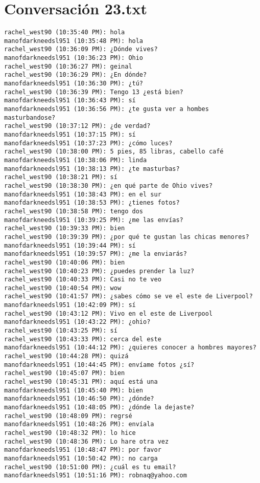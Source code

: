 \section{Conversaci\'on 23.txt}

\begin{verbatim}
rachel_west90 (10:35:40 PM): hola
manofdarkneedsl951 (10:35:48 PM): hola
rachel_west90 (10:36:09 PM): ¿Dónde vives?
manofdarkneedsl951 (10:36:23 PM): Ohio
rachel_west90 (10:36:27 PM): geinal
rachel_west90 (10:36:29 PM): ¿En dónde?
manofdarkneedsl951 (10:36:30 PM): ¿tú?
rachel_west90 (10:36:39 PM): Tengo 13 ¿está bien?
manofdarkneedsl951 (10:36:43 PM): sí
manofdarkneedsl951 (10:36:56 PM): ¿te gusta ver a hombes masturbandose?
rachel_west90 (10:37:12 PM): ¿de verdad?
manofdarkneedsl951 (10:37:15 PM): sí
manofdarkneedsl951 (10:37:23 PM): ¿cómo luces?
rachel_west90 (10:38:00 PM): 5 pies, 85 libras, cabello café
manofdarkneedsl951 (10:38:06 PM): linda
manofdarkneedsl951 (10:38:13 PM): ¿te masturbas?
rachel_west90 (10:38:21 PM): sí
rachel_west90 (10:38:30 PM): ¿en qué parte de Ohio vives?
manofdarkneedsl951 (10:38:43 PM): en el sur
manofdarkneedsl951 (10:38:53 PM): ¿tienes fotos?
rachel_west90 (10:38:58 PM): tengo dos
manofdarkneedsl951 (10:39:25 PM): ¿me las envías?
rachel_west90 (10:39:33 PM): bien
rachel_west90 (10:39:39 PM): ¿por qué te gustan las chicas menores?
manofdarkneedsl951 (10:39:44 PM): sí
manofdarkneedsl951 (10:39:57 PM): ¿me la enviarás?
rachel_west90 (10:40:06 PM): bien
rachel_west90 (10:40:23 PM): ¿puedes prender la luz?
rachel_west90 (10:40:33 PM): Casi no te veo
rachel_west90 (10:40:54 PM): wow
rachel_west90 (10:41:57 PM): ¿sabes cómo se ve el este de Liverpool?
manofdarkneedsl951 (10:42:09 PM): sí
rachel_west90 (10:43:12 PM): Vivo en el este de Liverpool
manofdarkneedsl951 (10:43:22 PM): ¿ohio?
rachel_west90 (10:43:25 PM): sí
rachel_west90 (10:43:33 PM): cerca del este
manofdarkneedsl951 (10:44:12 PM): ¿quieres conocer a hombres mayores?
rachel_west90 (10:44:28 PM): quizá
manofdarkneedsl951 (10:44:45 PM): envíame fotos ¿sí?
rachel_west90 (10:45:07 PM): bien
rachel_west90 (10:45:31 PM): aquí está una
manofdarkneedsl951 (10:45:40 PM): bien
manofdarkneedsl951 (10:46:50 PM): ¿dónde?
manofdarkneedsl951 (10:48:05 PM): ¿dónde la dejaste?
rachel_west90 (10:48:09 PM): regrsé
manofdarkneedsl951 (10:48:26 PM): envíala
rachel_west90 (10:48:32 PM): lo hice
rachel_west90 (10:48:36 PM): Lo hare otra vez
manofdarkneedsl951 (10:48:47 PM): por favor
manofdarkneedsl951 (10:50:42 PM): no carga
rachel_west90 (10:51:00 PM): ¿cuál es tu email?
manofdarkneedsl951 (10:51:16 PM): robnaq@yahoo.com

\end{verbatim}
